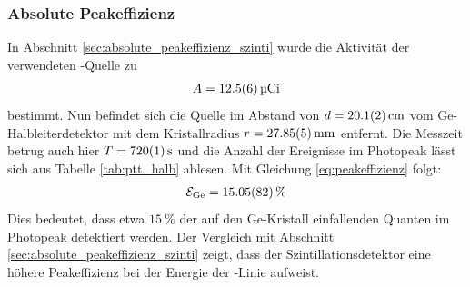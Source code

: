 \documentclass[11pt, a4paper]{article}
\numberwithin{equation}{section}
\newcommand{\cs}{\isotope[137]{Cs}}
\begin{document}
\subsubsection{Absolute Peakeffizienz}
In Abschnitt \ref{sec:absolute_peakeffizienz_szinti} wurde die Aktivität der verwendeten \cs{}-Quelle zu
\begin{align}
	A = \SI{12.5 +- 0.6}{\micro Ci}
\end{align}
bestimmt.
Nun befindet sich die Quelle im Abstand von $d = \SI{20.1 +- 0.2}{\centi\metre}$ vom Ge-Halbleiterdetektor mit dem Kristallradius $r = \SI{27.85 +- 0.05}{\milli\metre}$ entfernt.
Die Messzeit betrug auch hier $T = \SI{720 +- 1}{\second}$ und die Anzahl der Ereignisse im Photopeak lässt sich aus Tabelle \ref{tab:ptt_halb} ablesen.
Mit Gleichung \eqref{eq:peakeffizienz} folgt:
\begin{align}
	\mathcal{E}_\mathrm{Ge} = \SI{15.05 +- 0.82}{\percent}
\end{align}
Dies bedeutet, dass etwa $\SI{15}{\percent}$ der auf den Ge-Kristall einfallenden Quanten im Photopeak detektiert werden.
Der Vergleich mit Abschnitt \ref{sec:absolute_peakeffizienz_szinti} zeigt, dass der Szintillationsdetektor eine höhere Peakeffizienz bei der Energie der \cs{}-Linie aufweist.
\end{document}
